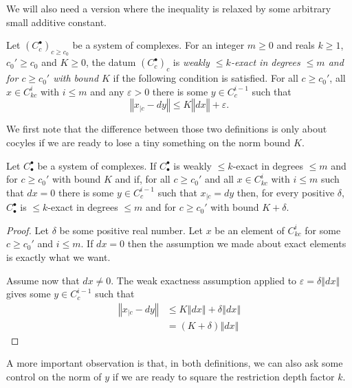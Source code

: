 We will also need a version where the inequality is relaxed by some arbitrary small additive constant.

\begin{definition}
  \label{is_weak_bounded_exact}
  \leanok
  Let $(C_c^\bullet)_{c\geq c_0}$ be a system of complexes.
  For an integer $m\geq 0$ and reals $k \ge 1$, $c_0'\geq c_0$ and $K\geq0$,
  the datum $(C_c^\bullet)_c$ is
  \emph{weakly $\leq k$-exact in degrees $\leq m$ and for $c\geq c_0'$ with bound $K$} if the following condition is satisfied.
  For all $c\geq c_0'$, all $x\in C_{kc}^i$ with $i\leq m$ and any $ε > 0$
  there is some $y\in C_c^{i-1}$ such that
  \[
    ‖x_{|c} - dy‖ ≤ K ‖dx‖ + ε.
  \]
\end{definition}

We first note that the difference between those two definitions is only about cocyles if we are ready to lose
a tiny something on the norm bound $K$. 



\begin{lemma}
  \label{is_bounded_exact_of_weakly}
  Let $C_\bullet^\bullet$ be a system of complexes. If $C_\bullet^\bullet$ is
  weakly $\leq k$-exact in degrees $\leq m$ and for $c\geq c_0'$ with bound $K$ and if,
  for all $c\geq c_0'$ and all $x\in C_{kc}^i$ with $i\leq m$ such that $dx = 0$
  there is some $y\in C_c^{i-1}$  such that
  $x_{|c} = dy$ then, for every positive $δ$,
  $C_\bullet^\bullet$ is $\leq k$-exact in degrees $\leq m$ and for $c\geq c_0'$ with
  bound $K + δ$.
\end{lemma}

\begin{proof}
  \leanok
  Let $δ$ be some positive real number.
  Let $x$ be an element of $C_{kc}^i$ for some $c ≥ c_0'$ and $i ≤ m$. If $dx = 0$
  then the assumption we made about exact elements is exactly what we want.

  Assume now that $dx ≠ 0$. The weak exactness assumption applied to $ε = δ‖dx‖$
  gives some $y\in C_c^{i-1}$ such that
  \begin{align*}
    ‖x_{|c} - dy‖ &≤ K‖dx‖ + δ‖dx‖ \\
                  &= (K + δ)‖dx‖
  \end{align*}
\end{proof}

A more important observation is that, in both definitions, we can also ask some
control on the norm of $y$ if we are ready to square the restriction depth factor $k$.

